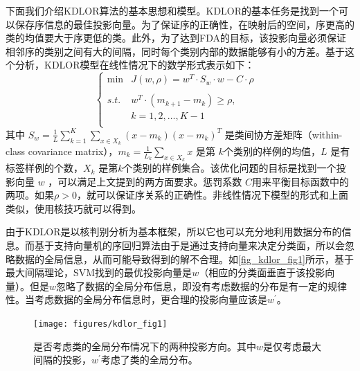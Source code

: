 下面我们介绍KDLOR算法的基本思想和模型。KDLOR的基本任务是找到一个可以保存序信息的最佳投影向量。为了保证序的正确性，在映射后的空间，序更高的类的均值要大于序更低的类。此外，为了达到FDA的目标，该投影向量必须保证相邻序的类别之间有大的间隔，同时每个类别内部的数据能够有小的方差。基于这个分析，KDLOR模型在线性情况下的数学形式表示如下：
\begin{equation}
\label{kdlor}
\left\{\begin{array}{rll} \min & J(w,\rho)=w^{T}\cdot S_{w}\cdot w-C\cdot \rho& \\
\\
s.t. & w^{T}\cdot (m_{k+1}-m_{k})\geq\rho,{} \\
     & k = 1,2,\dots,K-1\\
\end{array}
\right.
\end{equation}
其中 \(S_{w} = \frac{1}{L}\sum_{k=1}^{K}\sum_{x\in X_{k}}(x-m_{k})(x-m_{k})^{T}\) 是类间协方差矩阵（within-class covariance matrix），\(m_{k}=\frac{1}{L_{k}}\sum_{x\in X_{k}}x\) 是第 \(k\)个类别的样例的均值，\(L\) 是有标签样例的个数，\(X_{k}\) 是第\(k\)个类别的样例集合。该优化问题的目标是找到一个投影向量 \(w\) ，可以满足上文提到的两方面要求。惩罚系数 \(C\)用来平衡目标函数中的两项。如果\(\rho>0\)，就可以保证序关系的正确性。非线性情况下模型的形式和上面类似，使用核技巧就可以得到。

由于KDLOR是以核判别分析为基本框架，所以它也可以充分地利用数据分布的信息。而基于支持向量机的序回归算法由于是通过支持向量来决定分类面，所以会忽略数据的全局信息，从而可能导致得到的解不合理\citep{sun2010kernel}。如\autoref{fig_kdlor_fig1}所示，基于最大间隔理论，SVM找到的最优投影向量是\(w\)（相应的分类面垂直于该投影向量）。但是\(w\)忽略了数据的全局分布信息，即没有考虑数据的分布是有一定的规律性。当考虑数据的全局分布信息时，更合理的投影向量应该是\(w^{'}\)。


\begin{figure}[htb]
   \centering
   \texttt{[image: figures/kdlor\_fig1]}
\caption{是否考虑类的全局分布情况下的两种投影方向。其中$w$是仅考虑最大间隔的投影，$w^{'}$考虑了类的全局分布。}
\label{fig_kdlor_fig1}
\end{figure}

